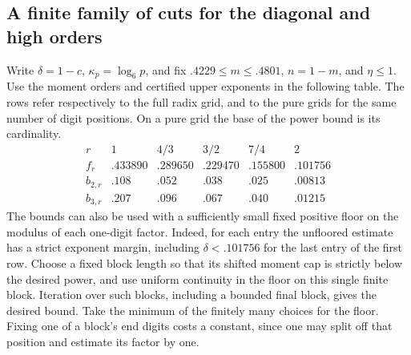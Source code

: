 \documentclass[11pt,a4paper]{article}
\theoremstyle{paperplain}
\numberwithin{equation}{section}
\begin{document}
\subsection{A finite family of cuts for the diagonal and high orders}
\label{six:adaptive}
Write $\delta=1-c$, $\kappa_p=\log_6p$, and fix
$.4229\le m\le .4801$, $n=1-m$, and $\eta\le1$. Use the moment
orders and certified upper exponents in the following table. The rows
refer respectively to the full radix grid, and to the pure grids for
the same number of digit positions. On a pure grid the base of the
power bound is its cardinality.
\[
\begin{array}{c|rrrrr}
r&1&4/3&3/2&7/4&2\\ \hline
f_r&.433890&.289650&.229470&.155800&.101756\\
b_{2,r}&.108&.052&.038&.025&.00813\\
b_{3,r}&.207&.096&.067&.040&.01215
\end{array}
\]
The bounds can also be used with a sufficiently small fixed positive
floor on the modulus of each one-digit factor. Indeed, for each entry
the unfloored estimate has a strict exponent margin, including
$\delta<.101756$ for the last entry of the first row. Choose a fixed
block length so that its shifted moment cap is strictly below the
desired power, and use uniform continuity in the floor on this
single finite block. Iteration over such blocks, including a bounded
final block, gives the desired bound. Take the minimum of the finitely
many choices for the floor. Fixing one of a block's end digits costs a
constant, since one may split off that position and estimate its
factor by one.
\end{document}
